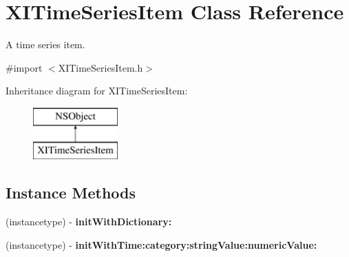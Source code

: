 \hypertarget{interface_x_i_time_series_item}{}\section{X\+I\+Time\+Series\+Item Class Reference}
\label{interface_x_i_time_series_item}


A time series item.  




{\ttfamily \#import $<$X\+I\+Time\+Series\+Item.\+h$>$}

Inheritance diagram for X\+I\+Time\+Series\+Item\+:\begin{figure}[H]
\begin{center}
\leavevmode
\includegraphics[height=2.000000cm]{interface_x_i_time_series_item}
\end{center}
\end{figure}
\subsection*{Instance Methods}
\begin{DoxyCompactItemize}
\item 
\hypertarget{interface_x_i_time_series_item_a4a0771ae9fa6d549c19fe4cb7e272975}{}\label{interface_x_i_time_series_item_a4a0771ae9fa6d549c19fe4cb7e272975} 
(instancetype) -\/ {\bfseries init\+With\+Dictionary\+:}
\item 
\hypertarget{interface_x_i_time_series_item_a9efaec12739cff8db3035d2ae89c5a66}{}\label{interface_x_i_time_series_item_a9efaec12739cff8db3035d2ae89c5a66} 
(instancetype) -\/ {\bfseries init\+With\+Time\+:category\+:string\+Value\+:numeric\+Value\+:}
\end{DoxyCompactItemize}
